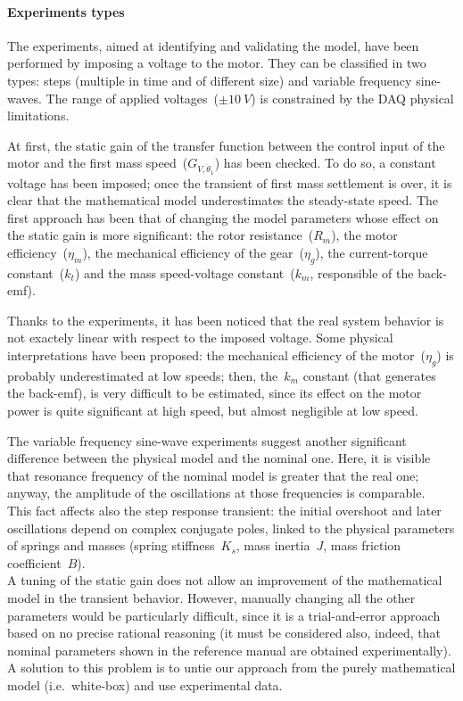 \paragraph{Experiments types}
The experiments, aimed at identifying and validating the model, have been performed by imposing a voltage to the motor. They can be classified in two types: steps (multiple in time and of different size) and variable frequency sine-waves. The range of applied voltages~($\pm 10\ V$) is constrained by the DAQ physical limitations.

At first, the static gain of the transfer function between the control input of the motor and the first mass speed~($G_{V,\dot{\theta}_1}$) has been checked. To do so, a constant voltage has been imposed; once the transient of first mass settlement is over, it is clear that the mathematical model underestimates the steady-state speed.
The first approach has been that of changing the model parameters whose effect on the static gain is more significant: the rotor resistance~($R_m$), the motor efficiency~($\eta_m$), the mechanical efficiency of the gear~($\eta_g$), the current-torque constant~($k_t$) and the mass speed-voltage constant~($k_m$, responsible of the back-emf).

Thanks to the experiments, it has been noticed that the real system behavior is not exactely linear with respect to the imposed voltage. Some physical interpretations have been proposed: the mechanical efficiency of the motor~($\eta_g$) is probably underestimated at low speeds; then, the~$k_m$ constant (that generates the back-emf), is very difficult to be estimated, since its effect on the motor power is quite significant at high speed, but almost negligible at low speed.


The variable frequency sine-wave experiments suggest another significant difference between the physical model and the nominal one. Here, it is visible that resonance frequency of the nominal model is greater that the real one; anyway, the amplitude of the oscillations at those frequencies is comparable. \\
This fact affects also the step response transient: the initial overshoot and later oscillations depend on complex conjugate poles, linked to the physical parameters of springs and masses (spring stiffness~$K_s$, mass inertia~$J$, mass friction coefficient~$B$). \\

A tuning of the static gain does not allow an improvement of the mathematical model in the transient behavior. However, manually changing all the other parameters would be particularly difficult, since it is a trial-and-error approach based on no precise rational reasoning (it must be considered also, indeed, that nominal parameters shown in the reference manual are obtained experimentally).
A solution to this problem is to untie our approach from the purely mathematical model (i.e.\ white-box) and use experimental data.

